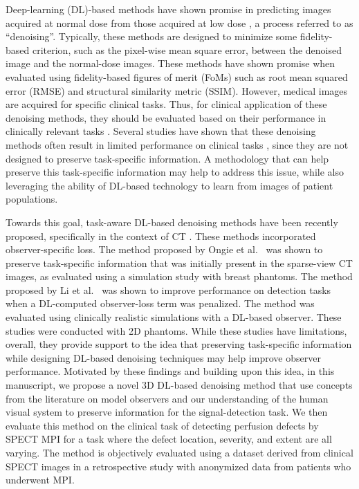 \documentclass[]{spie}  %
\begin{document}
Deep-learning (DL)-based methods have shown promise in predicting images acquired at normal dose from those acquired at low dose \cite{yang2018low,ramon2018initial}, a process referred to as “denoising”. Typically, these methods are designed to minimize some fidelity-based criterion, such as the pixel-wise mean square error, between the denoised image and the normal-dose images. These methods have shown promise when evaluated using fidelity-based figures of merit (FoMs) such as root mean squared error (RMSE) and structural similarity metric (SSIM). However, medical images are acquired for specific clinical tasks. Thus, for clinical application of these denoising methods, they should be evaluated based on their performance in clinically relevant tasks \cite{barrett1990objective,jha2021objective,barrett2013foundations}. Several studies have shown that these denoising methods often result in limited performance on clinical tasks \cite{yu2020ai,prabhat2021deep,ongie2022optimizing}, since they are not designed to preserve task-specific information. A methodology that can help preserve this task-specific information may help to address this issue, while also leveraging the ability of DL-based technology to learn from images of patient populations.

Towards this goal, task-aware DL-based denoising methods have been recently proposed, specifically in the context of CT \cite{ongie2022optimizing,li2022task}. These methods incorporated observer-specific loss. The method proposed by Ongie et al.~\cite{ongie2022optimizing} was shown to preserve task-specific information that was initially present in the sparse-view CT images, as evaluated using a simulation study with breast phantoms. The method proposed by Li et al.~\cite{li2022task} was shown to improve performance on detection tasks when a DL-computed observer-loss term was penalized. The method was evaluated using clinically realistic simulations with a DL-based observer. These studies were conducted with 2D phantoms. While these studies have limitations, overall, they provide support to the idea that preserving task-specific information while designing DL-based denoising techniques may help improve observer performance. Motivated by these findings and building upon this idea, in this manuscript, we propose a novel 3D DL-based denoising method that use concepts from the literature on model observers and our understanding of the human visual system to preserve information for the signal-detection task. We then evaluate this method on the clinical task of detecting perfusion defects by SPECT MPI for a task where the defect location, severity, and extent are all varying. The method is objectively evaluated using a dataset derived from clinical SPECT images in a retrospective study with anonymized data from patients who underwent MPI.
\end{document}
